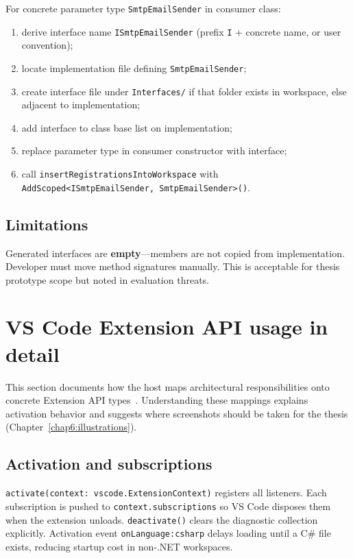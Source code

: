 For concrete parameter type \texttt{SmtpEmailSender} in consumer class:
\begin{enumerate}
	\item derive interface name \texttt{ISmtpEmailSender} (prefix \texttt{I} + concrete name, or user convention);
	\item locate implementation file defining \texttt{SmtpEmailSender};
	\item create interface file under \texttt{Interfaces/} if that folder exists in workspace, else adjacent to implementation;
	\item add interface to class base list on implementation;
	\item replace parameter type in consumer constructor with interface;
	\item call \texttt{insertRegistrationsIntoWorkspace} with \texttt{AddScoped<ISmtpEmailSender, SmtpEmailSender>()}.
\end{enumerate}

\subsection{Limitations}

Generated interfaces are \textbf{empty}---members are not copied from implementation. Developer must move method signatures manually. This is acceptable for thesis prototype scope but noted in evaluation threats.

\section{VS Code Extension API usage in detail}
\label{chap4:vscode-api}

This section documents how the host maps architectural responsibilities onto concrete Extension API types~\cite{vscode-api}. Understanding these mappings explains activation behavior and suggests where screenshots should be taken for the thesis (Chapter~\ref{chap6:illustrations}).

\subsection{Activation and subscriptions}

\texttt{activate(context: vscode.ExtensionContext)} registers all listeners. Each subscription is pushed to \texttt{context.subscriptions} so VS Code disposes them when the extension unloads. \texttt{deactivate()} clears the diagnostic collection explicitly. Activation event \texttt{onLanguage:csharp} delays loading until a C\# file exists, reducing startup cost in non-.NET workspaces.

